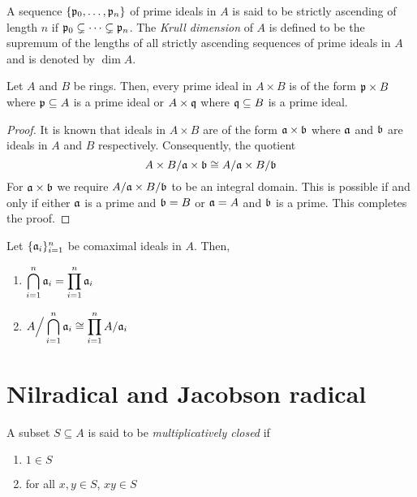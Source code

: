 \begin{definition}
    A sequence $\{\mathfrak p_0,\ldots,\mathfrak p_n\}$ of prime ideals in $A$ is said to be strictly ascending of length $n$ if $\mathfrak p_0\subsetneq\cdots\subsetneq\mathfrak p_n$. The \textit{Krull dimension} of $A$ is defined to be the supremum of the lengths of all strictly ascending sequences of prime ideals in $A$ and is denoted by $\dim A$.
\end{definition}

\begin{proposition}
    Let $A$ and $B$ be rings. Then, every prime ideal in $A\times B$ is of the form $\mathfrak p\times B$ where $\mathfrak p\subseteq A$ is a prime ideal or $A\times\mathfrak q$ where $\mathfrak q\subseteq B$ is a prime ideal.
\end{proposition}
\begin{proof}
    It is known that ideals in $A\times B$ are of the form $\mathfrak a\times\mathfrak b$ where $\mathfrak a$ and $\mathfrak b$ are ideals in $A$ and $B$ respectively. Consequently, the quotient 
    \begin{equation*}
        A\times B/\mathfrak a\times\mathfrak b\cong A/\mathfrak a\times B/\mathfrak b
    \end{equation*}
    For $\mathfrak a\times\mathfrak b$ we require $A/\mathfrak a\times B/\mathfrak b$ to be an integral domain. This is possible if and only if either $\mathfrak a$ is a prime and $\mathfrak b = B$ or $\mathfrak a = A$ and $\mathfrak b$ is a prime. This completes the proof.
\end{proof}

\begin{theorem}
    Let $\{\mathfrak a_i\}_{i = 1}^n$ be comaximal ideals in $A$. Then, 
    \begin{enumerate}[label=(\alph*)]
        \item $\displaystyle\bigcap_{i = 1}^n\mathfrak a_i = \prod_{i = 1}^n\mathfrak a_i$ 
        \item $\displaystyle A\Big/\bigcap_{i = 1}^n\mathfrak a_i\cong\prod_{i = 1}^n A/\mathfrak a_i$
    \end{enumerate}
\end{theorem}

\section{Nilradical and Jacobson radical}

\begin{definition}
    A subset $S\subseteq A$ is said to be \textit{multiplicatively closed} if 
    \begin{enumerate}[label=(\alph*)]
        \item $1\in S$ 
        \item for all $x,y\in S$, $xy\in S$
    \end{enumerate}
\end{definition}


